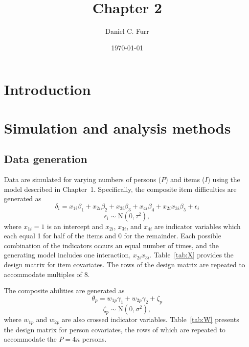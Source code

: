 \documentclass[12pt, letterpaper]{article}
\title{Chapter 2}
\author{Daniel C. Furr}
\date{\today}
\begin{document}

\newcommand{\comment}[1]{{\footnotesize[\textit{#1}]}}

\maketitle

\tableofcontents
\newpage
{\footnotesize }


\section{Introduction}


\section{Simulation and analysis methods}

\subsection{Data generation}

Data are simulated for varying numbers of persons ($P$) and items ($I$) using the model described in Chapter~1. Specifically, the composite item difficulties are generated as
\begin{equation}
	\delta_i = x_{1i}\beta_1 + x_{2i}\beta_2 + x_{3i}\beta_3 + x_{4i}\beta_4 + 
		x_{2i}x_{3i}\beta_5 + \epsilon_i
\end{equation}
\begin{equation}
	\epsilon_i \sim \mathrm{N}(0, \tau^2)
,\end{equation}
where $x_{1i} = 1$ is an intercept and $x_{2i}$, $x_{3i}$, and $x_{4i}$ are indicator variables which each equal 1 for half of the items and 0 for the remainder. Each possible combination of the indicators occurs an equal number of times, and the generating model includes one interaction, $x_{2i}x_{3i}$. Table~\ref{tab:X} provides the design matrix for item covariates. The rows of the design matrix are repeated to accommodate multiples of 8.



The composite abilities are generated as
\begin{equation} \label{eq:theta}
	\theta_p = w_{1p}\gamma_1 + w_{2p}\gamma_2  + \zeta_p
\end{equation}
\begin{equation} \label{eq:zeta}
	\zeta_p \sim \mathrm{N}(0, \sigma^2)
,\end{equation}
where $w_{1p}$ and $w_{2p}$ are also crossed indicator variables. Table~\ref{tab:W} presents the design matrix for person covariates, the rows of which are repeated to accommodate the $P = 4n$ persons.
\end{document}
